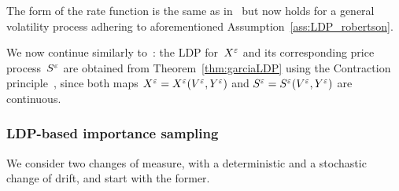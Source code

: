 \begin{remark}
The form of the rate function is the same as in~\cite[Lemma 3.1]{Robertson2010SampleModels} but now holds for a general volatility process adhering to aforementioned Assumption~\ref{ass:LDP_robertson}.
\end{remark}
We now continue similarly to~\cite[Section~3]{Robertson2010SampleModels}:
the LDP for~$X^\varepsilon$ and its corresponding price process~$S^\varepsilon$ are obtained from Theorem~\ref{thm:garciaLDP} using the Contraction principle~\cite[Theorem 4.2.1]{Dembo2010LargeApplications}, 
since both maps $X^\varepsilon=X^\varepsilon(V^\varepsilon,Y^\varepsilon)$ and $S^\varepsilon=\nobreak S^\varepsilon(V^\varepsilon,Y^\varepsilon)$ are continuous.


\subsubsection{LDP-based importance sampling}
We consider two changes of measure, with a deterministic and a stochastic change of drift,
and start with the former.\\

